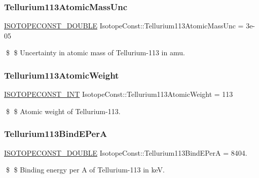 \subsubsection{\texorpdfstring{Tellurium113\+Atomic\+Mass\+Unc}{Tellurium113AtomicMassUnc}}
{\footnotesize\ttfamily \mbox{\hyperlink{group___isotope_const-_macros_ga8f45a7272ce02c0b4c65c44636ed719a}{I\+S\+O\+T\+O\+P\+E\+C\+O\+N\+S\+T\+\_\+\+D\+O\+U\+B\+LE}} Isotope\+Const\+::\+Tellurium113\+Atomic\+Mass\+Unc = 3e-\/05}

\$ \$ Uncertainty in atomic mass of Tellurium-\/113 in amu. \mbox{\label{group___isotope_const-_tellurium-_te113_gabd9841d658685481defb8309adf585cb}} 
\subsubsection{\texorpdfstring{Tellurium113\+Atomic\+Weight}{Tellurium113AtomicWeight}}
{\footnotesize\ttfamily \mbox{\hyperlink{group___isotope_const-_macros_ga5f18360b3e99483a35c32d789e62621c}{I\+S\+O\+T\+O\+P\+E\+C\+O\+N\+S\+T\+\_\+\+I\+NT}} Isotope\+Const\+::\+Tellurium113\+Atomic\+Weight = 113}

\$ \$ Atomic weight of Tellurium-\/113. \mbox{\label{group___isotope_const-_tellurium-_te113_gaa9f6edbe79f1a627a1fc7303a893890c}} 
\subsubsection{\texorpdfstring{Tellurium113\+Bind\+E\+PerA}{Tellurium113BindEPerA}}
{\footnotesize\ttfamily \mbox{\hyperlink{group___isotope_const-_macros_ga8f45a7272ce02c0b4c65c44636ed719a}{I\+S\+O\+T\+O\+P\+E\+C\+O\+N\+S\+T\+\_\+\+D\+O\+U\+B\+LE}} Isotope\+Const\+::\+Tellurium113\+Bind\+E\+PerA = 8404.}

\$ \$ Binding energy per A of Tellurium-\/113 in keV. \mbox{\label{group___isotope_const-_tellurium-_te113_ga32b2816bb7e4caea1229aacd550e9e70}} 
